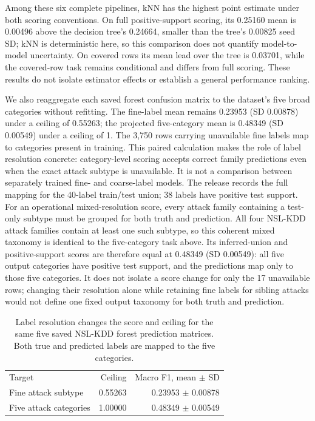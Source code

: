 \documentclass[journal]{IEEEtran}
\begin{document}
Among these six complete pipelines, kNN has the highest point estimate under both scoring conventions. On full positive-support scoring, its 0.25160 mean is 0.00496 above the decision tree's 0.24664, smaller than the tree's 0.00825 seed SD; kNN is deterministic here, so this comparison does not quantify model-to-model uncertainty. On covered rows its mean lead over the tree is 0.03701, while the covered-row task remains conditional and differs from full scoring. These results do not isolate estimator effects or establish a general performance ranking.

We also reaggregate each saved forest confusion matrix to the dataset's five broad categories without refitting. The fine-label mean remains 0.23953 (SD 0.00878) under a ceiling of 0.55263; the projected five-category mean is 0.48349 (SD 0.00549) under a ceiling of 1. The 3,750 rows carrying unavailable fine labels map to categories present in training. This paired calculation makes the role of label resolution concrete: category-level scoring accepts correct family predictions even when the exact attack subtype is unavailable. It is not a comparison between separately trained fine- and coarse-label models. The release records the full mapping for the 40-label train/test union; 38 labels have positive test support. For an operational mixed-resolution score, every attack family containing a test-only subtype must be grouped for both truth and prediction. All four NSL-KDD attack families contain at least one such subtype, so this coherent mixed taxonomy is identical to the five-category task above. Its inferred-union and positive-support scores are therefore equal at 0.48349 (SD 0.00549): all five output categories have positive test support, and the predictions map only to those five categories. It does not isolate a score change for only the 17 unavailable rows; changing their resolution alone while retaining fine labels for sibling attacks would not define one fixed output taxonomy for both truth and prediction.

\begin{table}[h]\centering
\caption{Label resolution changes the score and ceiling for the same five saved NSL-KDD forest prediction matrices. Both true and predicted labels are mapped to the five categories.}
\begin{tabular}{lrr}
Target & Ceiling & Macro F1, mean $\pm$ SD\\
Fine attack subtype & 0.55263 & 0.23953 $\pm$ 0.00878\\
Five attack categories & 1.00000 & 0.48349 $\pm$ 0.00549\\
\end{tabular}\end{table}
\end{document}
